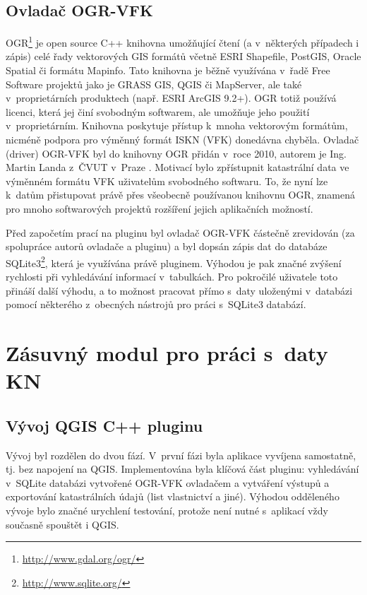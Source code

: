 \documentclass[a4paper,12pt]{article}
\begin{document}
\subsection{Ovladač OGR-VFK}
OGR\footnote{\url{http://www.gdal.org/ogr/}} je open source C++ knihovna umožňující čtení (a v~některých případech i zápis)
celé řady vektorových GIS formátů včetně ESRI Shapefile, PostGIS, Oracle Spatial či formátu \mbox{Mapinfo}.
Tato knihovna je běžně využívána v~řadě Free Software projektů jako je GRASS GIS, QGIS či \mbox{MapServer}, ale také v~proprietárních produktech (např. ESRI ArcGIS 9.2+).
OGR totiž používá licenci, která jej činí svobodným softwarem, ale umožňuje jeho použití v~proprietárním.
Knihovna poskytuje přístup k~mnoha vektorovým formátům, nicméně podpora pro výměnný formát ISKN (VFK) donedávna chyběla.
Ovladač (driver) OGR-VFK byl do knihovny OGR přidán v~roce 2010, autorem je Ing. Martin Landa z~ČVUT v~Praze \cite{vfkDriver}.
Motivací bylo zpřístupnit katastrální data ve výměnném formátu VFK uživatelům svobodného softwaru.
To, že nyní lze k~datům přistupovat právě přes všeobecně používanou knihovnu OGR, znamená pro mnoho softwarových projektů rozšíření jejich aplikačních možností.

Před započetím prací na pluginu byl ovladač OGR-VFK částečně zrevidován (za spolupráce autorů ovladače a pluginu)
a byl dopsán zápis dat do databáze SQLite3\footnote{\url{http://www.sqlite.org/}}, která je využívána právě pluginem.
Výhodou je pak značné zvýšení rychlosti při vyhledávání informací v~tabulkách.
Pro pokročilé uživatele toto přináší další výhodu, a to možnost pracovat přímo s~daty uloženými v~databázi pomocí některého z~obecných nástrojů pro práci s~SQLite3 databází.


\section{Zásuvný modul pro práci s~daty KN}

\subsection{Vývoj QGIS C++ pluginu}
Vývoj byl rozdělen do dvou fází.
V~první fázi byla aplikace vyvíjena samostatně, tj. bez napojení na QGIS.
Implementována byla klíčová část pluginu: vyhledávání v~SQLite databázi vytvořené OGR-VFK ovladačem a vytváření výstupů a exportování katastrálních údajů (list vlastnictví a jiné).
Výhodou odděleného vývoje bylo značné urychlení testování, protože není nutné s~aplikací vždy současně spouštět i QGIS.
\end{document}
